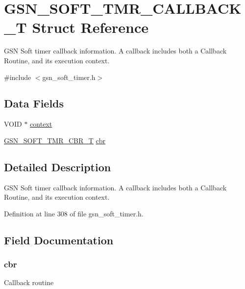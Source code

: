 \hypertarget{a00228}{
\section{GSN\_\-SOFT\_\-TMR\_\-CALLBACK\_\-T Struct Reference}
\label{a00228}
}


GSN Soft timer callback information. A callback includes both a Callback Routine, and its execution context.  




{\ttfamily \#include $<$gsn\_\-soft\_\-timer.h$>$}

\subsection*{Data Fields}
\begin{DoxyCompactItemize}
\item 
VOID $\ast$ \hyperlink{a00228_a7e5a25499bcd2b9280a9b79d4c5b7975}{context}
\item 
\hyperlink{a00673_ga9bb74ab1272c117587bf1fadf84849de}{GSN\_\-SOFT\_\-TMR\_\-CBR\_\-T} \hyperlink{a00228_a4cda2de91d5b0862f7350bde9eb20141}{cbr}
\end{DoxyCompactItemize}


\subsection{Detailed Description}
GSN Soft timer callback information. A callback includes both a Callback Routine, and its execution context. 

Definition at line 308 of file gsn\_\-soft\_\-timer.h.



\subsection{Field Documentation}
\hypertarget{a00228_a4cda2de91d5b0862f7350bde9eb20141}{
\subsubsection[{cbr}]{ {\bf cbr}}}
\label{a00228_a4cda2de91d5b0862f7350bde9eb20141}
Callback routine 


